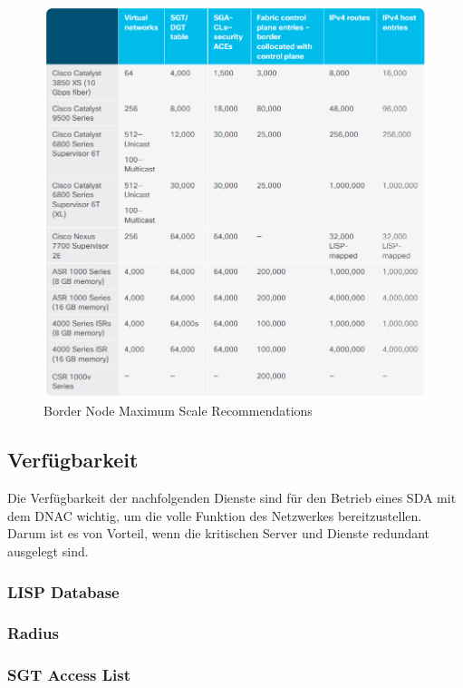 \begin{figure}[H]
	\centering
	\includegraphics[width=1\linewidth]{img/Analyse/MaxScale-BorderNode}
	\caption{Border Node Maximum Scale Recommendations \cite{sda-designguide} }
	\label{fig:Border Node Maximum Scale RecommendationsA}
\end{figure}




\subsection{Verfügbarkeit}
Die Verfügbarkeit der nachfolgenden Dienste sind für den Betrieb eines SDA mit dem DNAC wichtig, um die volle Funktion des Netzwerkes bereitzustellen. Darum ist es von Vorteil, wenn die kritischen Server und Dienste redundant ausgelegt sind.


\subsubsection{LISP Database}

\subsubsection{Radius}

\subsubsection{SGT Access List}




